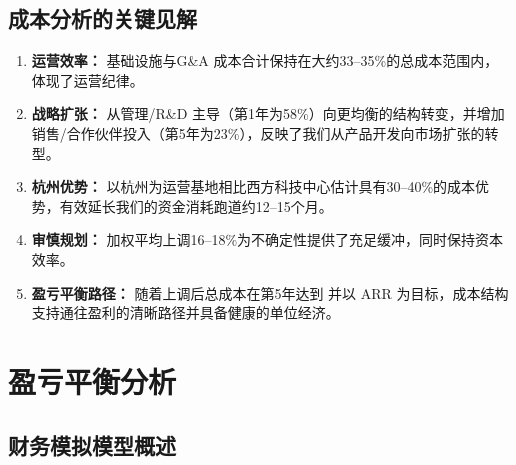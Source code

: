 \documentclass[11pt, a4paper, oneside]{article}
\begin{document}
\begin{table}[H]
\centering
\caption{基础设施 \& 平台投资 ROI}
\label{tab:infrastructure_roi}
\end{table}

\subsection{成本分析的关键见解}

\begin{enumerate}
    \item \textbf{运营效率：} 基础设施与G\&A 成本合计保持在大约33--35\%的总成本范围内，体现了运营纪律。
    
    \item \textbf{战略扩张：} 从管理/R\&D 主导（第1年为58\%）向更均衡的结构转变，并增加销售/合作伙伴投入（第5年为23\%），反映了我们从产品开发向市场扩张的转型。
    
    \item \textbf{杭州优势：} 以杭州为运营基地相比西方科技中心估计具有30--40\%的成本优势，有效延长我们的资金消耗跑道约12--15个月。
    
    \item \textbf{审慎规划：} 加权平均上调16--18\%为不确定性提供了充足缓冲，同时保持资本效率。
    
    \item \textbf{盈亏平衡路径：} 随着上调后总成本在第5年达到  并以  ARR 为目标，成本结构支持通往盈利的清晰路径并具备健康的单位经济。
\end{enumerate}

\section{盈亏平衡分析}
\subsection{财务模拟模型概述}
\label{subsec:simple-model}
\end{document}
